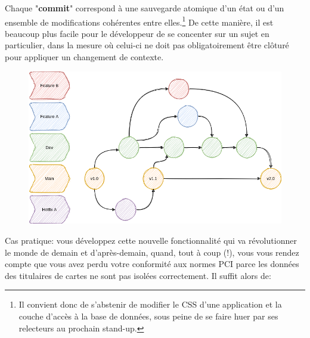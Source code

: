 \documentclass[11pt]{amsbook}
\begin{document}
Chaque "\textbf{commit}" correspond à une sauvegarde atomique d’un état ou d’un ensemble de modifications cohérentes entre elles.\footnote{Il convient donc de s’abstenir de modifier le CSS d’une application et la couche d’accès à la base de données, sous peine de se faire huer par ses relecteurs au prochain stand-up.}
De cette manière, il est beaucoup plus facile pour le développeur de se concenter sur un sujet en particulier, dans la mesure où celui-ci ne doit pas obligatoirement être clôturé pour appliquer un changement de contexte.


\begin{figure}[h]{}
\centering\includegraphics[width=2.5truein]{images/diagrams/git-workflow.png}
\caption{}

\end{figure}

Cas pratique: vous développez cette nouvelle fonctionnalité qui va révolutionner le monde de demain et d’après-demain, quand, tout à coup (!), vous vous rendez compte que vous avez perdu votre conformité aux normes PCI parce les données des titulaires de cartes ne sont pas isolées correctement.
Il suffit alors de:
\end{document}
